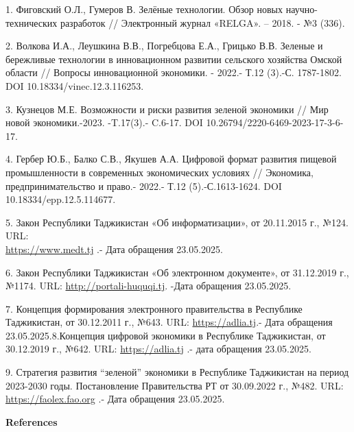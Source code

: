 \begin{references}
1. Фиговский О.Л., Гумеров В. Зелёные технологии. Обзор новых
научно-технических разработок // Электронный журнал «RELGA». -- 2018. -
№3 (336).

2. Волкова И.А., Леушкина В.В., Погребцова Е.А., Грицько В.В. Зеленые и
бережливые технологии в инновационном развитии сельского хозяйства
Омской области // Вопросы инновационной экономики. - 2022.- Т.12 (3).-С.
1787-1802. DOI 10.18334/vinec.12.3.116253.

3. Кузнецов М.Е. Возможности и риски развития зеленой экономики // Мир
новой экономики.-2023. -T.17(3).- C.6-17. DOI
10.26794/2220-6469-2023-17-3-6-17.

4. Гербер Ю.Б., Балко С.В., Якушев А.А. Цифровой формат развития пищевой
промышленности в современных экономических условиях // Экономика,
предпринимательство и право.- 2022.- Т.12 (5).-С.1613-1624. DOI
10.18334/epp.12.5.114677.

5. Закон Республики Таджикистан «Об информатизации», от 20.11.2015 г.,
№124. URL:\\
\href{https://www.medt.tj/documents/main/normativno-pravovie-akti/zakonodatelnie-akti/ru/02518-ru.pdf}{https://www.medt.tj} .-
Дата обращения 23.05.2025.

6. Закон Республики Таджикистан «Об электронном документе», от 31.12.2019
г., №1174. URL:
\href{http://portali-huquqi.tj/publicadliya/view_qonunhoview.php?showdetail=&asosi_id=1763}{http://portali-huquqi.tj}.
-Дата обращения 23.05.2025.

7. Концепция формирования электронного правительства в Республике
Таджикистан, от 30.12.2011 г., №643. URL:
\href{https://adlia.tj/show_doc.fwx?rgn=116092}{https://adlia.tj}.- Дата обращения
23.05.2025.8.Концепция цифровой экономики в Республике Таджикистан, от 30.12.2019
г., №642. URL: \href{https://adlia.tj/show_doc.fwx?rgn=135392}{https://adlia.tj} .- дата
обращения 23.05.2025.

9. Стратегия развития ``зеленой'' экономики в Республике Таджикистан на
период 2023-2030 годы. Постановление Правительства РТ от 30.09.2022 г.,
№482. URL: \href{https://faolex.fao.org/docs/pdf/taj221507.pdf}{https://faolex.fao.org} .- Дата
обращения 23.05.2025.
\end{references}

\begin{center}
{\bfseries References}
\end{center}

